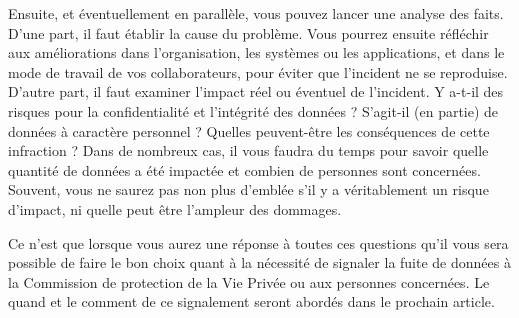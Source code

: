 Ensuite, et éventuellement en parallèle, vous pouvez lancer une analyse des faits. D’une part, il faut établir la cause du problème. Vous pourrez ensuite réfléchir aux améliorations dans l’organisation, les systèmes ou les applications, et dans le mode de travail de vos collaborateurs, pour éviter que l’incident ne se reproduise. D’autre part, il faut examiner l’impact réel ou éventuel de l’incident. Y a-t-il des risques pour la confidentialité et l’intégrité des données ? S’agit-il (en partie) de données à caractère personnel ? Quelles peuvent-être les conséquences de cette infraction ? Dans de nombreux cas, il vous faudra du temps pour savoir quelle quantité de données a été impactée et combien de personnes sont concernées. Souvent, vous ne saurez pas non plus d’emblée s’il y a véritablement un risque d’impact, ni quelle peut être l’ampleur des dommages.

Ce n’est que lorsque vous aurez une réponse à toutes ces questions qu’il vous sera possible de faire le bon choix quant à la nécessité de signaler la fuite de données à la Commission de protection de la Vie Privée ou aux personnes concernées. Le quand et le comment de ce signalement seront abordés dans le prochain article.




